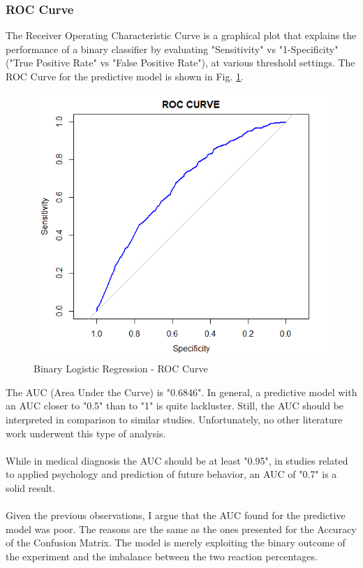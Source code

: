 \documentclass[a4paper]{article}
\begin{document}
\newpage

\subsubsection{ROC Curve}

The Receiver Operating Characteristic Curve is a graphical plot that explains the performance of a binary classifier by evaluating "Sensitivity" vs "1-Specificity" ("True Positive Rate" vs "False Positive Rate"), at various threshold settings. The ROC Curve for the predictive model is shown in Fig. \ref{roc}.

\begin{figure}[H]
	\centering
	\includegraphics[scale=0.7]{images/analysis/roc.png}
	\caption{Binary Logistic Regression - ROC Curve}
	\label{roc}
\end{figure}

\noindent
The AUC (Area Under the Curve) is "0.6846". In general, a predictive model with an AUC closer to "0.5" than to "1" is quite lackluster. Still, the AUC should be interpreted in comparison to similar studies. Unfortunately, no other literature work underwent this type of analysis.
\\ \\
While in medical diagnosis the AUC should be at least "0.95", in studies related to applied psychology and prediction of future behavior, an AUC of "0.7" is a solid result.
\\ \\
Given the previous observations, I argue that the AUC found for the predictive model was poor. The reasons are the same as the ones presented for the Accuracy of the Confusion Matrix. The model is merely exploiting the binary outcome of the experiment and the imbalance between the two reaction percentages.
\end{document}
